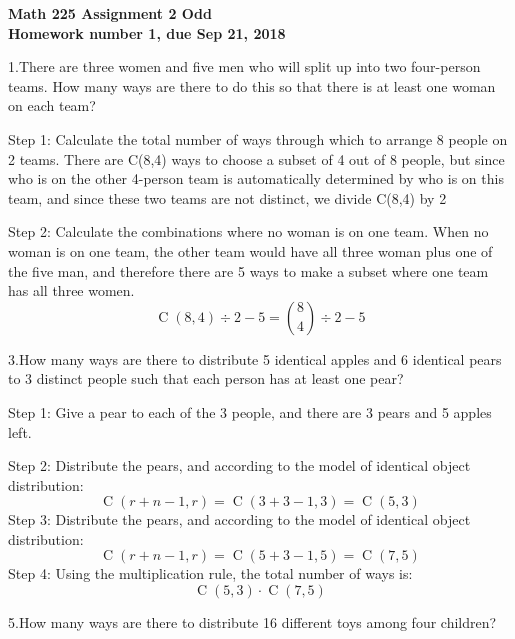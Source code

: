 \documentclass[12pt]{amsart}
\DeclareMathOperator{\comb}{C}
\begin{document}
\begin{center}
  \bfseries
  Math 225 Assignment 2 Odd\\
  Homework number 1, due Sep 21, 2018
\end{center}

\bigskip

1.There are three women and five men who will split up into two four-person
teams. How many ways are there to do this so that there is at least one woman
on each team?
\bigskip

Step 1: Calculate the total number of ways through which to arrange 8 people on 2 teams. There are C(8,4) ways to choose a subset of 4 out of 8 people, but since who is on the other 4-person team is automatically determined by who is on this team, and since these two teams are not distinct, we divide C(8,4) by 2
\bigskip

Step 2: Calculate the combinations where no woman is on one team. When no woman is on one team, the other team would have all three woman plus one of the five man, and therefore there are 5 ways to make a subset where one team has all three women.
\bigskip
\begin{displaymath}
\comb(8,4)\div2- 5 = \binom{8}{4}\div2-5
\end{displaymath}
\bigskip

3.How many ways are there to distribute 5 identical apples and 6 identical pears
to 3 distinct people such that each person has at least one pear?
\bigskip

Step 1: Give a pear to each of the 3 people, and there are 3 pears and 5 apples left. 
\smallskip

Step 2: Distribute the pears, and according to the model of identical object distribution:
\begin{displaymath}
\comb(r+n-1,r)= \comb(3+3-1,3) = \comb(5,3)
\end{displaymath}
Step 3: Distribute the pears, and according to the model of identical object distribution:
\begin{displaymath}
\comb(r+n-1,r)= \comb(5+3-1,5) = \comb(7,5)
\end{displaymath}
Step 4: Using the multiplication rule, the total number of ways is:
\begin{displaymath}
\comb(5,3)\cdot \comb(7,5)
\end{displaymath}

\bigskip
5.How many ways are there to distribute 16 different toys among four children?
\smallskip
\end{document}
